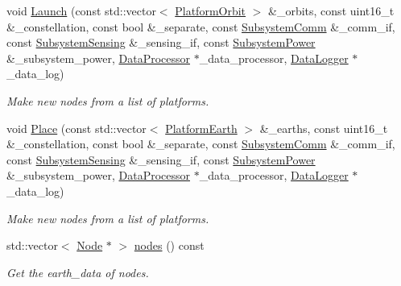 \begin{DoxyCompactItemize}
void \hyperlink{classosse_1_1collaborate_1_1_observing_system_af0d0030fd4d55ca3ac12bd65074d5b7d}{Launch} (const std\+::vector$<$ \hyperlink{classosse_1_1collaborate_1_1_platform_orbit}{Platform\+Orbit} $>$ \&\+\_\+orbits, const uint16\+\_\+t \&\+\_\+constellation, const bool \&\+\_\+separate, const \hyperlink{classosse_1_1collaborate_1_1_subsystem_comm}{Subsystem\+Comm} \&\+\_\+comm\+\_\+if, const \hyperlink{classosse_1_1collaborate_1_1_subsystem_sensing}{Subsystem\+Sensing} \&\+\_\+sensing\+\_\+if, const \hyperlink{classosse_1_1collaborate_1_1_subsystem_power}{Subsystem\+Power} \&\+\_\+subsystem\+\_\+power, \hyperlink{classosse_1_1collaborate_1_1_data_processor}{Data\+Processor} $\ast$\+\_\+data\+\_\+processor, \hyperlink{classosse_1_1collaborate_1_1_data_logger}{Data\+Logger} $\ast$\+\_\+data\+\_\+log)
\begin{DoxyCompactList}\small\item\em Make new nodes from a list of platforms. \end{DoxyCompactList}\item 
void \hyperlink{classosse_1_1collaborate_1_1_observing_system_a083b14c76f2e4af95d0228435b0644a4}{Place} (const std\+::vector$<$ \hyperlink{classosse_1_1collaborate_1_1_platform_earth}{Platform\+Earth} $>$ \&\+\_\+earths, const uint16\+\_\+t \&\+\_\+constellation, const bool \&\+\_\+separate, const \hyperlink{classosse_1_1collaborate_1_1_subsystem_comm}{Subsystem\+Comm} \&\+\_\+comm\+\_\+if, const \hyperlink{classosse_1_1collaborate_1_1_subsystem_sensing}{Subsystem\+Sensing} \&\+\_\+sensing\+\_\+if, const \hyperlink{classosse_1_1collaborate_1_1_subsystem_power}{Subsystem\+Power} \&\+\_\+subsystem\+\_\+power, \hyperlink{classosse_1_1collaborate_1_1_data_processor}{Data\+Processor} $\ast$\+\_\+data\+\_\+processor, \hyperlink{classosse_1_1collaborate_1_1_data_logger}{Data\+Logger} $\ast$\+\_\+data\+\_\+log)
\begin{DoxyCompactList}\small\item\em Make new nodes from a list of platforms. \end{DoxyCompactList}\item 
std\+::vector$<$ \hyperlink{classosse_1_1collaborate_1_1_node}{Node} $\ast$ $>$ \hyperlink{classosse_1_1collaborate_1_1_observing_system_ab870ae4c9e01fdf97682908857d882ed}{nodes} () const
\begin{DoxyCompactList}\small\item\em Get the earth\+\_\+data of nodes. \end{DoxyCompactList}\item 

\end{DoxyCompactItemize}

